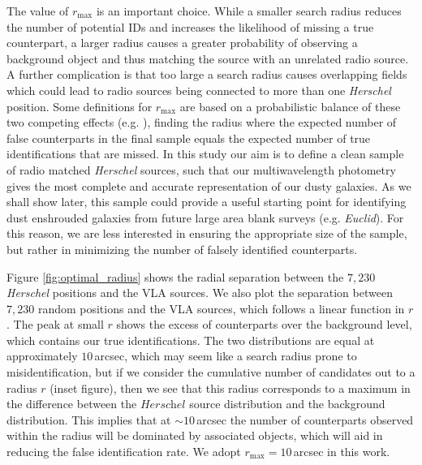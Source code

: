 The value of $r_{\textrm{max}}$ is an important choice. While a smaller search radius reduces the number of potential IDs and increases the likelihood of missing a true counterpart, a larger radius causes a greater probability of observing a background object and thus matching the source with an unrelated radio source. A further complication is that too large a search radius causes overlapping fields which could lead to radio sources being connected to more than one \textit{Herschel} position. Some definitions for $r_{\textrm{max}}$ are based on a probabilistic balance of these two competing effects (e.g. \citealt{Dye_2009}), finding the radius where the expected number of false counterparts in the final sample equals the expected number of true identifications that are missed. In this study our aim is to define a clean sample of radio matched \textit{Herschel} sources, such that our multiwavelength photometry gives the most complete and accurate representation of our dusty galaxies. As we shall show later, this sample could provide a useful starting point for identifying dust enshrouded galaxies from future large area blank surveys (e.g. \textit{Euclid}). For this reason, we are less interested in ensuring the appropriate size of the sample, but rather in minimizing the number of falsely identified counterparts.

Figure \ref{fig:optimal_radius} shows the radial separation between the $7,230$ \textit{Herschel} positions and the VLA sources. We also plot the separation between $7,230$ random positions and the VLA sources, which follows a linear function in $r$. The peak at small $r$ shows the excess of counterparts over the background level, which contains our true identifications. The two distributions are equal at approximately $10\,$arcsec, which may seem like a search radius prone to misidentification, but if we consider the cumulative number of candidates out to a radius $r$ (inset figure), then we see that this radius corresponds to a maximum in the difference between the $\textit{Herschel}$ source distribution and the background distribution. This implies that at $\sim 10\,$arcsec the number of counterparts observed within the radius will be dominated by associated objects, which will aid in reducing the false identification rate. We adopt $r_{\textrm{max}} = 10\,$arcsec in this work.

